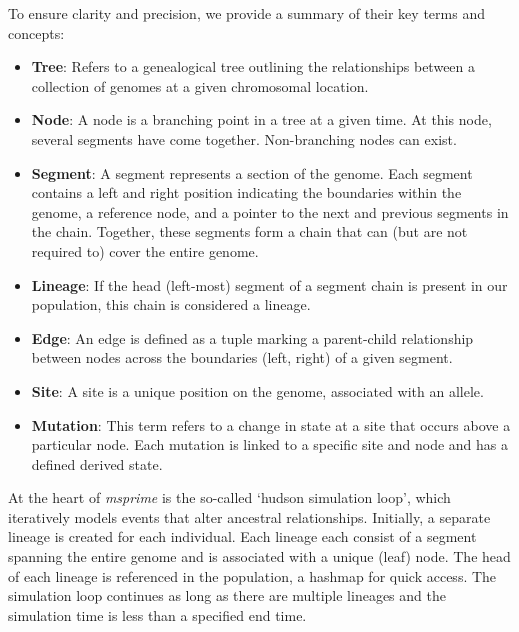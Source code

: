 To ensure clarity and precision, we provide a summary of their key terms and concepts:
\begin{itemize}
      \item \textbf{Tree}: Refers to a genealogical tree outlining the relationships between a collection of genomes at a given chromosomal location.
      \item \textbf{Node}: A node is a branching point in a tree at a given time.
            At this node, several segments have come together. Non-branching nodes can exist.
      \item \textbf{Segment}: A segment represents a section of the genome.
            Each segment contains a left and right position indicating the boundaries within the genome, a reference node, and a pointer to the next and previous segments in the chain.
            Together, these segments form a chain that can (but are not required to) cover the entire genome.
      \item \textbf{Lineage}: If the head (left-most) segment  of a segment chain is present in our population, this chain is considered a lineage.
      \item \textbf{Edge}: An edge is defined as a tuple marking a parent-child relationship between nodes across the boundaries (left, right) of a given segment.
      \item \textbf{Site}: A site is a unique position on the genome, associated with an allele.
      \item \textbf{Mutation}: This term refers to a change in state at a site that occurs above a particular node.
            Each mutation is linked to a specific site and node and has a defined derived state.
\end{itemize}

At the heart of \textit{msprime} is the so-called `hudson simulation loop', which iteratively models events that alter ancestral relationships.
Initially, a separate lineage is created for each individual.
Each lineage each consist of a segment spanning the entire genome and is associated with a unique (leaf) node.
The head of each lineage is referenced in the population, a hashmap for quick access.
The simulation loop continues as long as there are multiple lineages and the simulation time is less than a specified end time.


